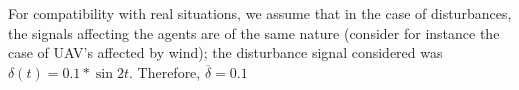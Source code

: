

For compatibility with real situations, we assume that in the case
of disturbances, the signals affecting the agents are of the same nature
(consider for instance the case of UAV's affected by wind); the disturbance
signal considered was $\delta(t) = 0.1 * \sin 2t$. Therefore,
$\overline{\delta} = 0.1$
